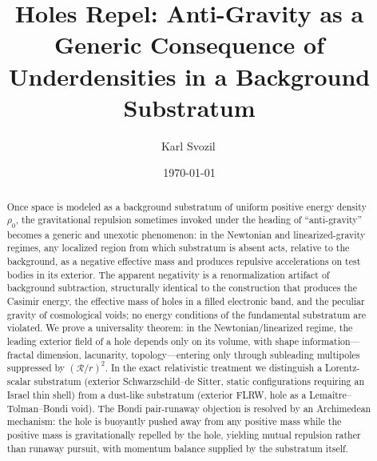 \documentclass[%
  reprint,
  superscriptaddress,
  showpacs,
  showkeys,
  amsmath,amssymb,
  pra,
  longbibliography,
  floatfix,
  x11names
]{revtex4-2}
\begin{document}
\title{Holes Repel: Anti-Gravity as a Generic Consequence of Underdensities in a Background Substratum}

\author{Karl Svozil\,}

\date{\today}

\begin{abstract}
Once space is modeled as a background substratum of uniform positive energy density $\rho_0$, the gravitational repulsion sometimes invoked under the heading of ``anti-gravity'' becomes a generic and unexotic phenomenon: in the Newtonian and linearized-gravity regimes, any localized region from which substratum is absent acts, relative to the background, as a negative effective mass and produces repulsive accelerations on test bodies in its exterior. The apparent negativity is a renormalization artifact of background subtraction, structurally identical to the construction that produces the Casimir energy, the effective mass of holes in a filled electronic band, and the peculiar gravity of cosmological voids; no energy conditions of the fundamental substratum are violated. We prove a universality theorem: in the Newtonian/linearized regime, the leading exterior field of a hole depends only on its volume, with shape information---fractal dimension, lacunarity, topology---entering only through subleading multipoles suppressed by $(\mathcal{R}/r)^2$. In the exact relativistic treatment we distinguish a Lorentz-scalar substratum (exterior Schwarzschild--de Sitter, static configurations requiring an Israel thin shell) from a dust-like substratum (exterior FLRW, hole as a Lema\^itre--Tolman--Bondi void). The Bondi pair-runaway objection is resolved by an Archimedean mechanism: the hole is buoyantly pushed away from any positive mass while the positive mass is gravitationally repelled by the hole, yielding mutual repulsion rather than runaway pursuit, with momentum balance supplied by the substratum itself.
\end{abstract}


\maketitle
\end{document}
